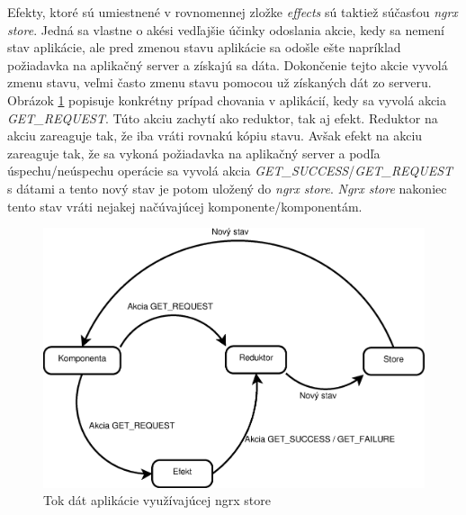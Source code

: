 Efekty, ktoré sú umiestnené v rovnomennej zložke \textit{effects} sú taktiež súčasťou \textit{ngrx store}. Jedná sa vlastne o akési vedľajšie účinky odoslania akcie, kedy sa nemení stav aplikácie, ale pred zmenou stavu aplikácie sa odošle ešte napríklad požiadavka na aplikačný server a získajú sa dáta. Dokončenie tejto akcie vyvolá zmenu stavu, veľmi často zmenu stavu pomocou už získaných dát zo serveru. Obrázok \ref{fig:ngrx} popisuje konkrétny prípad chovania v aplikácií, kedy sa vyvolá akcia \textit{GET\_REQUEST}. Túto akciu zachytí ako reduktor, tak aj efekt. Reduktor na akciu zareaguje tak, že iba vráti rovnakú kópiu stavu. Avšak efekt na akciu zareaguje tak, že sa vykoná požiadavka na aplikačný server a podľa úspechu/neúspechu operácie sa vyvolá akcia \textit{GET\_SUCCESS}/\textit{GET\_REQUEST} s dátami a tento nový stav je potom uložený do \textit{ngrx store}. \textit{Ngrx store} nakoniec tento stav vráti nejakej načúvajúcej komponente/komponentám. 
\begin{figure}[h]
  \centering
  \includegraphics[scale=0.4]{fig/ngrx-efekt.eps}
  \caption{Tok dát aplikácie využívajúcej ngrx store}
  \label{fig:ngrx}
\end{figure}

